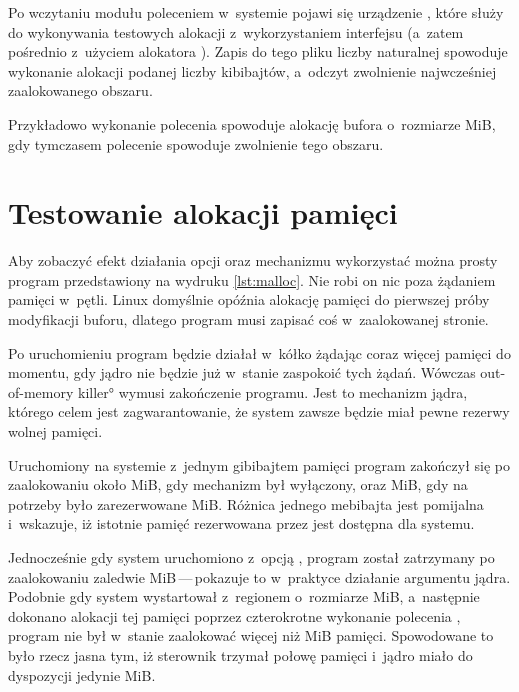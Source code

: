 Po wczytaniu modułu poleceniem  w~systemie
pojawi się urządzenie , które służy do wykonywania
testowych alokacji z~wykorzystaniem interfejsu  
(a~zatem pośrednio z~użyciem alokatora ).  Zapis do tego
pliku liczby naturalnej spowoduje wykonanie alokacji podanej liczby
kibibajtów, a~odczyt zwolnienie najwcześniej zaalokowanego obszaru.

Przykładowo wykonanie polecenia 
spowoduje alokację bufora o~rozmiarze \unit[10]{MiB}, gdy tymczasem
polecenie  spowoduje zwolnienie tego obszaru.


\section{Testowanie alokacji pamięci}

Aby zobaczyć efekt działania opcji  oraz mechanizmu
 wykorzystać można prosty program  przedstawiony
na wydruku \ref{lst:malloc}.  Nie robi on nic poza żądaniem pamięci
w~pętli.  Linux domyślnie opóźnia alokację pamięci do pierwszej próby
modyfikacji buforu, dlatego program musi zapisać coś w~zaalokowanej
stronie.



Po uruchomieniu program będzie działał w~kółko żądając coraz więcej
pamięci do momentu, gdy jądro nie będzie już w~stanie zaspokoić tych
żądań.  Wówczas \ang*{out-of-memory killer} wymusi zakończenie
programu.  Jest to mechanizm jądra, którego celem jest
zagwarantowanie, że system zawsze będzie miał pewne rezerwy wolnej
pamięci.

Uruchomiony na systemie z~jednym gibibajtem pamięci program zakończył
się po zaalokowaniu około \unit[965]{MiB}, gdy mechanizm  był
wyłączony, oraz \unit[964]{MiB}, gdy na potrzeby  było
zarezerwowane \unit[512]{MiB}.  Różnica jednego mebibajta jest
pomijalna i~wskazuje, iż istotnie pamięć rezerwowana przez 
jest dostępna dla systemu.

Jednocześnie gdy system uruchomiono z~opcją , program
został zatrzymany po zaalokowaniu zaledwie
\unit[477]{MiB}\,---\,pokazuje to w~praktyce działanie argumentu
 jądra.  Podobnie gdy system wystartował z~regionem
 o~rozmiarze \unit[512]{MiB}, a~następnie dokonano alokacji
tej pamięci poprzez czterokrotne wykonanie polecenia
, program  nie był
w~stanie zaalokować więcej niż \unit[454]{MiB} pamięci.  Spowodowane
to było rzecz jasna tym, iż sterownik  trzymał połowę
pamięci i~jądro miało do dyspozycji jedynie \unit[512]{MiB}.

